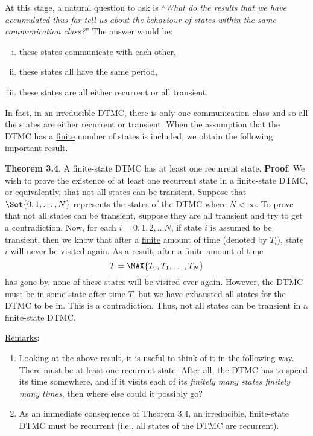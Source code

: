 At this stage, a natural question to ask is ``\emph{What do the results that we have accumulated thus
    far tell us about the behaviour of states within the same communication class?}'' The answer
would be:
\begin{enumerate}[(i)]
    \item these states communicate with each other,
    \item these states all have the same period,
    \item these states are all either recurrent or all transient.
\end{enumerate}
In fact, in an irreducible DTMC, there is only one communication class and so all the states
are either recurrent or transient. When the assumption that the DTMC has a \underline{finite} number of
states is included, we obtain the following important result.
\begin{Result}
    \textbf{Theorem 3.4}. A finite-state DTMC has at least one recurrent state.
    \tcblower{}
    \textbf{Proof}: We wish to prove the existence of at least
    one recurrent state in a finite-state DTMC, or equivalently,
    that not all states can be transient. Suppose that $ \Set{0,1,\ldots,N} $
    represents the states of the DTMC where $ N<\infty $. To prove
    that not all states can be transient, suppose they
    are all transient and try to get a contradiction. Now, for each $ i=0,1,2,\ldots N $,
    if state $ i $ is assumed to be transient, then we know that after
    a \underline{finite} amount of time (denoted by $ T_i $),
    state $ i $ will never be visited again. As a result, after a finite amount
    of time
    \[ T=\MAX{T_0,T_1,\ldots,T_N} \]
    has gone by, none of these states will be visited ever again. However,
    the DTMC must be in some state after time $ T $, but we have exhausted
    all states for the DTMC to be in. This is a contradiction. Thus,
    not all states can be transient in a finite-state DTMC\@.
\end{Result}
\underline{Remarks}:
\begin{enumerate}[(1)]
    \item Looking at the above result, it is useful to think of it in the following way. There must be
          at least one recurrent state. After all, the DTMC has to spend its time somewhere, and if
          it visits each of its \emph{finitely many states finitely many times}, then where else could it
          possibly go?
    \item As an immediate consequence of Theorem 3.4, an irreducible, finite-state DTMC must be
          recurrent (i.e., all states of the DTMC are recurrent).
\end{enumerate}
